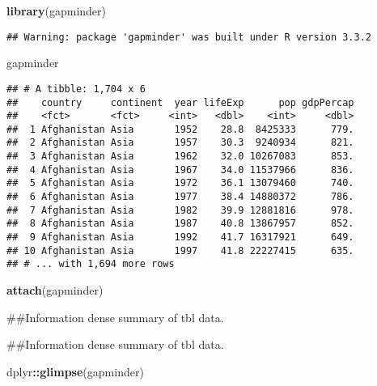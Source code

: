 \documentclass[]{article}
\title{}
\author{}
\date{}
\newenvironment{Shaded}{\begin{snugshade}}{\end{snugshade}}
\newcommand{\KeywordTok}[1]{\textcolor[rgb]{0.13,0.29,0.53}{\textbf{#1}}}
\newcommand{\NormalTok}[1]{#1}
\newcommand{\OperatorTok}[1]{\textcolor[rgb]{0.81,0.36,0.00}{\textbf{#1}}}
\begin{document}
\begin{Shaded}
\begin{Highlighting}[]
\KeywordTok{library}\NormalTok{(gapminder)}
\end{Highlighting}
\end{Shaded}

\begin{verbatim}
## Warning: package 'gapminder' was built under R version 3.3.2
\end{verbatim}

\begin{Shaded}
\begin{Highlighting}[]
\NormalTok{gapminder}
\end{Highlighting}
\end{Shaded}

\begin{verbatim}
## # A tibble: 1,704 x 6
##    country     continent  year lifeExp      pop gdpPercap
##    <fct>       <fct>     <int>   <dbl>    <int>     <dbl>
##  1 Afghanistan Asia       1952    28.8  8425333      779.
##  2 Afghanistan Asia       1957    30.3  9240934      821.
##  3 Afghanistan Asia       1962    32.0 10267083      853.
##  4 Afghanistan Asia       1967    34.0 11537966      836.
##  5 Afghanistan Asia       1972    36.1 13079460      740.
##  6 Afghanistan Asia       1977    38.4 14880372      786.
##  7 Afghanistan Asia       1982    39.9 12881816      978.
##  8 Afghanistan Asia       1987    40.8 13867957      852.
##  9 Afghanistan Asia       1992    41.7 16317921      649.
## 10 Afghanistan Asia       1997    41.8 22227415      635.
## # ... with 1,694 more rows
\end{verbatim}

\begin{Shaded}
\begin{Highlighting}[]
\KeywordTok{attach}\NormalTok{(gapminder)}
\end{Highlighting}
\end{Shaded}

\#\#Information dense summary of tbl data.

\begin{Shaded}
\begin{Highlighting}[]
\NormalTok{##Information dense summary of tbl data. }

\NormalTok{dplyr}\OperatorTok{::}\KeywordTok{glimpse}\NormalTok{(gapminder)}
\end{Highlighting}
\end{Shaded}
\end{document}
